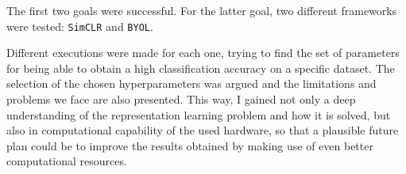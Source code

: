 The first two goals were successful. For the latter goal, two different frameworks were tested: \lstinline{SimCLR} and \lstinline{BYOL}. 

Different executions were made for each one, trying to find the set of parameters for being able to obtain a high classification accuracy on a specific dataset. The selection of the chosen hyperparameters was argued and the limitations and problems we face are also presented. This way, I gained not only a deep understanding of the representation learning problem and how it is solved, but also in computational capability of the used hardware, so that a plausible future plan could be to improve the results obtained by making use of even better computational resources.
